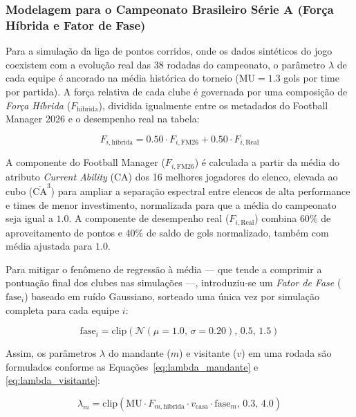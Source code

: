 \documentclass[12pt]{article}
\begin{document}
\subsubsection{Modelagem para o Campeonato Brasileiro Série A (Força Híbrida e Fator de Fase)}

Para a simulação da liga de pontos corridos, onde os dados sintéticos do jogo coexistem com a evolução real das 38 rodadas do campeonato, o parâmetro $\lambda$ de cada equipe é ancorado na média histórica do torneio ($\mathrm{MU} = 1.3$ gols por time por partida). A força relativa de cada clube é governada por uma composição de \textit{Força Híbrida} ($F_{\mathrm{hibrida}}$), dividida igualmente entre os metadados do Football Manager 2026 \cite{fm2026} e o desempenho real na tabela:

\begin{equation}
	F_{i, \mathrm{hibrida}} = 0.50 \cdot F_{i, \mathrm{FM26}} + 0.50 \cdot F_{i, \mathrm{Real}}
	\label{eq:forca_hibrida}
\end{equation}

A componente do Football Manager ($F_{i, \mathrm{FM26}}$) é calculada a partir da média do atributo \textit{Current Ability} (CA) dos 16 melhores jogadores do elenco, elevada ao cubo ($\overline{\mathrm{CA}}^3$) para ampliar a separação espectral entre elencos de alta performance e times de menor investimento, normalizada para que a média do campeonato seja igual a $1.0$. A componente de desempenho real ($F_{i, \mathrm{Real}}$) combina $60\%$ de aproveitamento de pontos e $40\%$ de saldo de gols normalizado, também com média ajustada para $1.0$.

Para mitigar o fenômeno de regressão à média — que tende a comprimir a pontuação final dos clubes nas simulações —, introduziu-se um \textit{Fator de Fase} ($\mathrm{fase}_i$) baseado em ruído Gaussiano, sorteado uma única vez por simulação completa para cada equipe $i$:

\begin{equation}
	\mathrm{fase}_i = \mathrm{clip} \left( \mathcal{N}(\mu=1.0, \, \sigma=0.20), \, 0.5, \, 1.5 \right)
	\label{eq:fator_fase}
\end{equation}

Assim, os parâmetros $\lambda$ do mandante ($m$) e visitante ($v$) em uma rodada são formulados conforme as Equações~\ref{eq:lambda_mandante} e \ref{eq:lambda_visitante}:

\begin{equation}
	\lambda_m = \mathrm{clip} \left( \mathrm{MU} \cdot F_{m, \mathrm{hibrida}} \cdot v_{\mathrm{casa}} \cdot \mathrm{fase}_m, \, 0.3, \, 4.0 \right)
	\label{eq:lambda_mandante}
\end{equation}
\end{document}
